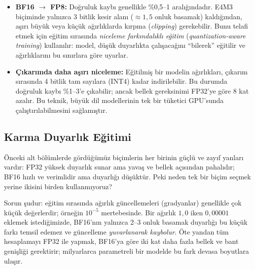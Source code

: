 \begin{itemize}
\begin{figure}[htbp]
\caption[Farklı yapay zeka modellerinin ağırlık dağılımları]{Farklı yapay zeka modellerinin tipik ağırlık dağılımları. Tüm modellerde ağırlıklar sıfır etrafında çan eğrisi biçiminde yoğunlaşır; CNN modelleri (ResNet) daha dar, Transformer modelleri (GPT, BERT) daha geniş kuyruklu dağılım gösterir. Bu yoğunlaşma, düşük bitli kayan nokta biçimlerinin yeterli duyarlık sağlayabilmesinin temel nedenidir.}
\label{fig:agirlik-dagilimi}
\end{figure}
\item \textbf{BF16 $\rightarrow$ FP8:} Doğruluk kaybı genellikle \%0{,}5--1 aralığındadır. E4M3 biçiminde yalnızca 3 bitlik kesir alanı ($\approx 1{,}5$ onluk basamak) kaldığından, aşırı büyük veya küçük ağırlıklarda kırpma (\emph{clipping}) gerekebilir. Bunu telafi etmek için eğitim sırasında \emph{niceleme farkındalıklı eğitim} (\emph{quantization-aware training}) kullanılır: model, düşük duyarlıkta çalışacağını ``bilerek'' eğitilir ve ağırlıklarını bu sınırlara göre uyarlar.
\item \textbf{Çıkarımda daha aşırı niceleme:} Eğitilmiş bir modelin ağırlıkları, çıkarım sırasında 4 bitlik tam sayılara (INT4) kadar indirilebilir. Bu durumda doğruluk kaybı \%1--3'e çıkabilir; ancak bellek gereksinimi FP32'ye göre 8 kat azalır. Bu teknik, büyük dil modellerinin tek bir tüketici GPU'sunda çalıştırılabilmesini sağlamıştır.
\end{itemize}

\subsection{Karma Duyarlık Eğitimi}

Önceki alt bölümlerde gördüğümüz biçimlerin her birinin güçlü ve zayıf yanları vardır: FP32 yüksek duyarlık sunar ama yavaş ve bellek açısından pahalıdır; BF16 hızlı ve verimlidir ama duyarlığı düşüktür. Peki neden tek bir biçim seçmek yerine ikisini birden kullanmıyoruz?

Sorun şudur: eğitim sırasında ağırlık güncellemeleri (gradyanlar) genellikle çok küçük değerlerdir; örneğin $10^{-5}$ mertebesinde. Bir ağırlık $1{,}0$ iken $0{,}00001$ eklemek istediğimizde, BF16'nın yalnızca 2--3 onluk basamak duyarlığı bu küçük farkı temsil edemez ve güncelleme \emph{yuvarlanarak kaybolur}. Öte yandan tüm hesaplamayı FP32 ile yapmak, BF16'ya göre iki kat daha fazla bellek ve bant genişliği gerektirir; milyarlarca parametreli bir modelde bu fark devasa boyutlara ulaşır.

